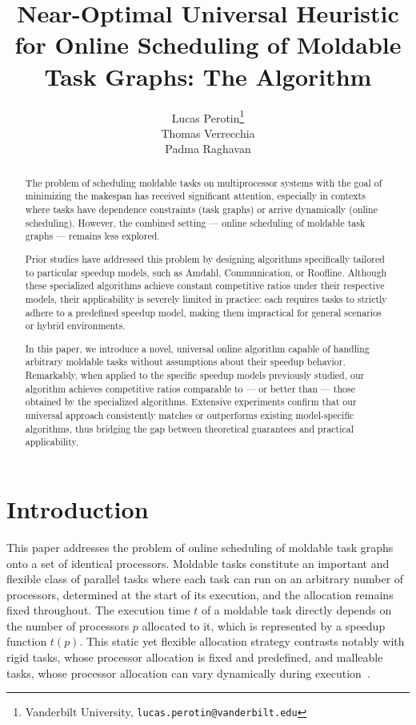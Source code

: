 \documentclass{article}
\title{Near-Optimal Universal Heuristic for Online Scheduling of Moldable Task Graphs: The \fair Algorithm}
\author{
  Lucas Perotin\thanks{Vanderbilt University, \texttt{lucas.perotin@vanderbilt.edu}} \\
  Thomas Verrecchia \\
  Padma Raghavan\footnotemark[1]
}
\begin{document}
\maketitle
\begin{abstract}
The problem of scheduling moldable tasks on multiprocessor systems with the goal of minimizing the makespan has received significant attention, especially in contexts where tasks have dependence constraints (task graphs) or arrive dynamically (online scheduling). However, the combined setting — online scheduling of moldable task graphs — remains less explored.

Prior studies have addressed this problem by designing algorithms specifically tailored to particular speedup models, such as Amdahl, Communication, or Roofline. Although these specialized algorithms achieve constant competitive ratios under their respective models, their applicability is severely limited in practice: each requires tasks to strictly adhere to a predefined speedup model, making them impractical for general scenarios or hybrid environments.

In this paper, we introduce a novel, universal online algorithm capable of handling arbitrary moldable tasks without assumptions about their speedup behavior. Remarkably, when applied to the specific speedup models previously studied, our algorithm achieves competitive ratios comparable to — or better than — those obtained by the specialized algorithms. Extensive experiments confirm that our universal approach consistently matches or outperforms existing model-specific algorithms, thus bridging the gap between theoretical guarantees and practical applicability.
\end{abstract}
\section{Introduction}

This paper addresses the problem of online scheduling of moldable task graphs onto a set of identical processors. Moldable tasks constitute an important and flexible class of parallel tasks where each task can run on an arbitrary number of processors, determined at the start of its execution, and the allocation remains fixed throughout. The execution time $t$ of a moldable task directly depends on the number of processors $p$ allocated to it, which is represented by a speedup function $t(p)$. This static yet flexible allocation strategy contrasts notably with rigid tasks, whose processor allocation is fixed and predefined, and malleable tasks, whose processor allocation can vary dynamically during execution~\cite{Feitelson96}.
\end{document}
